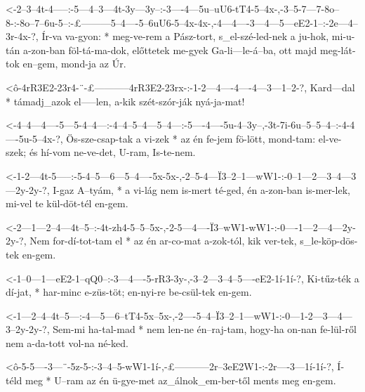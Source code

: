   {<-2--3--4t-4-----:-5---4--3---4t-3y---3y--:-3----4---5u--uU6-tT4-5--4x-,-3--5-7---7-8o--8-:-8o--7--6u-5--:-£---------5--4----5--6uU6-5--4x-4x-,-4---4----3---4---5---eE2-1--:-2e---4--3r-4x-?,}
  {  Ír-va va-gyon: * meg-ve-rem a  Pász-tort, s_el-szé-led-nek a   ju-hok, mi-u-tán a-zon-ban föl-tá-ma-dok, előttetek me-gyek Ga-li---le-á--ba,  ott majd meg-lát-tok en--gem, mond-ja az Úr.}



  {<ô-4rR3E2-23r4-¨-£-----------4rR3E2-23rx-:-1-2---4----4----4---3---1--2-?,}
  {   Kard---dal  * támadj_azok el-----len,   a-kik szét-szór-ják nyá-ja-mat!}

  {<-4--4---4----5---5-4--4---:-4--4--5--4---5--4---:-5----4----5u-4--3y--,-3t-7i-6u--5--5--4--:-4-4----5u-5--4x-?,}
  {  Ös-sze-csap-tak a vi-zek * az én fe-jem fö-lött, mond-tam: el-ve-szek; és hí-vom ne-ve-det, U-ram, Is-te-nem.}

  {<-1-2---4t-5-----:-5-4--5---6---5--4----5x-5x-,-2--5-4---Ï3--2--1---wW1-:-0--1---2--–3--4---3---2y-2y-?,}
  {  I-gaz A--tyám, * a vi-lág nem is-mert té-ged, én a-zon-ban is-mer-lek,  mi-vel te kül-döt-tél en-gem.}


  {<-2---1---2--4---4t--5--:-4t-zh4-5--5--5x-,-2-5---4----Ï3--wW1-wW1-:-0----1---2---4---2y-2y-?,}
  {  Nem for-dí-tot-tam el * az én  ar-co-mat  a-zok-tól, kik ver-tek,  s_le-köp-dös-tek en-gem.}

  {<-1--0---1---eE2-1--qQ0--:-3---4----5-rR3-3y-,-3--2---3--4--5----eE2-1í-1í-?,}
  {  Ki-tűz-ték a   dí-jat, * har-minc e-züs-töt; en-nyi-re be-csül-tek en-gem.}

  {<-1---2--4--4t--5---:-4---5---6--tT4-5x--5x-,-2----5--4--Ï3--2--1---wW1-:-0---1-2--–3---4---3--2y-2y-?,}
  {  Sem-mi ha-tal-mad * nem len-ne én--raj-tam, hogy-ha on-nan fe-lül-ről   nem a-da-tott vol-na né-ked.}



  {<ô-5-5----3---¨-5z-5-:-3--4--5-wW1-1í-,-£-----------2r--3eE2W1-:-2r----3---1í-1í-?,}
  {   Í-téld meg * U--ram az én ü-gye-met  az_álnok_em-ber-től      ments meg en-gem.}

